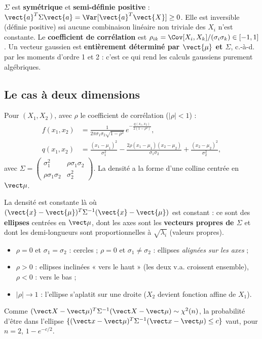 \documentclass[11pt,a4paper,openany]{book}
\begin{document}
\begin{rembox}[title={Ce que contient $\Sigma$}]
$\Sigma$ est \textbf{symétrique} et \textbf{semi-définie positive} : $\vect{a}^T\Sigma\vect{a}
= \Var[\vect{a}^T\vect{X}] \geq 0$. Elle est inversible (définie positive) ssi aucune
combinaison linéaire non triviale des $X_i$ n'est constante. Le \textbf{coefficient de
corrélation} est $\rho_{ik} = \Cov[X_i,X_k]/(\sigma_i\sigma_k) \in [-1,1]$. Un vecteur gaussien
est \textbf{entièrement déterminé par $\vect{\mu}$ et $\Sigma$}, c.-à-d. par les moments d'ordre
1 et 2 : c'est ce qui rend les calculs gaussiens purement algébriques.
\end{rembox}

\subsection{Le cas à deux dimensions}

\begin{propbox}[title={Densité d'un couple gaussien}]
Pour $(X_1,X_2)$, avec $\rho$ le coefficient de corrélation ($|\rho|<1$) :
\begin{align*}
f(x_1,x_2) &= \frac{1}{2\pi\sigma_1\sigma_2\sqrt{1-\rho^2}}\,e^{-\frac{q(x_1,x_2)}{2(1-\rho^2)}},\\
q(x_1,x_2) &= \frac{(x_1-\mu_1)^2}{\sigma_1^2}
- \frac{2\rho(x_1-\mu_1)(x_2-\mu_2)}{\sigma_1\sigma_2}
+ \frac{(x_2-\mu_2)^2}{\sigma_2^2},
\end{align*}
avec $\Sigma = \begin{pmatrix}\sigma_1^2 & \rho\sigma_1\sigma_2\\ \rho\sigma_1\sigma_2 &
\sigma_2^2\end{pmatrix}$. La densité a la forme d'une colline centrée en $\vect\mu$.
\end{propbox}

\begin{propbox}[title={Courbes de niveau}]
La densité est constante là où $(\vect{x}-\vect{\mu})^T\Sigma^{-1}(\vect{x}-\vect{\mu})$ est
constant : ce sont des \textbf{ellipses} centrées en $\vect\mu$, dont les axes sont les
\textbf{vecteurs propres de $\Sigma$} et dont les demi-longueurs sont proportionnelles à
$\sqrt{\lambda_i}$ (valeurs propres).
\begin{itemize}
\item $\rho = 0$ et $\sigma_1 = \sigma_2$ : cercles ; $\rho = 0$ et $\sigma_1\neq\sigma_2$ :
  ellipses \emph{alignées sur les axes} ;
\item $\rho > 0$ : ellipses inclinées « vers le haut » (les deux v.a. croissent ensemble),
  $\rho < 0$ : vers le bas ;
\item $|\rho|\to 1$ : l'ellipse s'aplatit sur une droite ($X_2$ devient fonction affine de
  $X_1$).
\end{itemize}
Comme $(\vect X-\vect\mu)^T\Sigma^{-1}(\vect X-\vect\mu) \sim \chi^2(n)$, la probabilité
d'être dans l'ellipse $\{(\vect x-\vect\mu)^T\Sigma^{-1}(\vect x-\vect\mu)\leq c\}$ vaut, pour $n=2$,
$1 - e^{-c/2}$.
\end{propbox}
\end{document}
